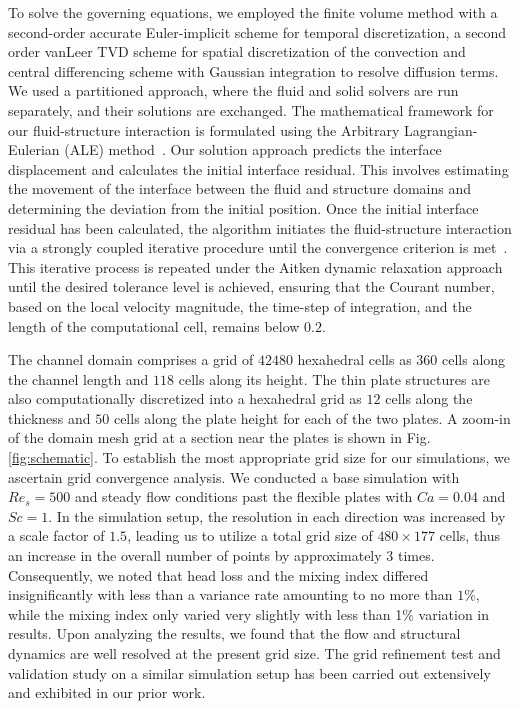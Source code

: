 \documentclass[%
aip,
amsmath,amssymb,
reprint,
]{revtex4-1}
\begin{document}
	To solve the governing equations, we employed the finite volume method with a second-order accurate Euler-implicit scheme for temporal discretization, a second order vanLeer TVD scheme for spatial discretization of the convection and central differencing scheme with Gaussian integration to resolve diffusion terms. We used a partitioned approach, where the fluid and solid solvers are run separately, and their solutions are exchanged. The mathematical framework for our fluid-structure interaction is formulated using the Arbitrary Lagrangian-Eulerian (ALE) method~\cite{Nguyen2010, Slone2002}. Our solution approach predicts the interface displacement and calculates the initial interface residual. This involves estimating the movement of the interface between the fluid and structure domains and determining the deviation from the initial position. Once the initial interface residual has been calculated, the algorithm initiates the fluid-structure interaction via a strongly coupled iterative procedure until the convergence criterion is met~\cite{Hrvoje2007, CampbellPaterson2011}. This iterative process is repeated under the Aitken dynamic relaxation approach until the desired tolerance level is achieved, ensuring that the Courant number, based on the local velocity magnitude, the time-step of integration, and the length of the computational cell, remains below $0.2$. 
	
	The channel domain comprises a grid of $42480$ hexahedral cells as $360$ cells along the channel length and $118$ cells along its height. The thin plate structures are also computationally discretized into a hexahedral grid as $12$ cells along the thickness and $50$ cells along the plate height for each of the two plates. A zoom-in of the domain mesh grid at a section near the plates is shown in Fig. \ref{fig:schematic}. To establish the most appropriate grid size for our simulations, we ascertain grid convergence analysis. We conducted a base simulation with $Re_s=500$ and steady flow conditions past the flexible plates with $Ca=0.04$ and $Sc=1$. In the simulation setup, the resolution in each direction was increased by a scale factor of $1.5$, leading us to utilize a total grid size of $480 \times 177$ cells, thus an increase in the overall number of points by approximately $3$ times. Consequently, we noted that head loss and the mixing index differed insignificantly with less than a variance rate amounting to no more than $1\%$, while the mixing index only varied very slightly with less than 1\% variation in results. Upon analyzing the results, we found that the flow and structural dynamics are well resolved at the present grid size. The grid refinement test and validation study on a similar simulation setup has been carried out extensively and exhibited in our prior work\cite{Self2019}. 
	
\end{document}

